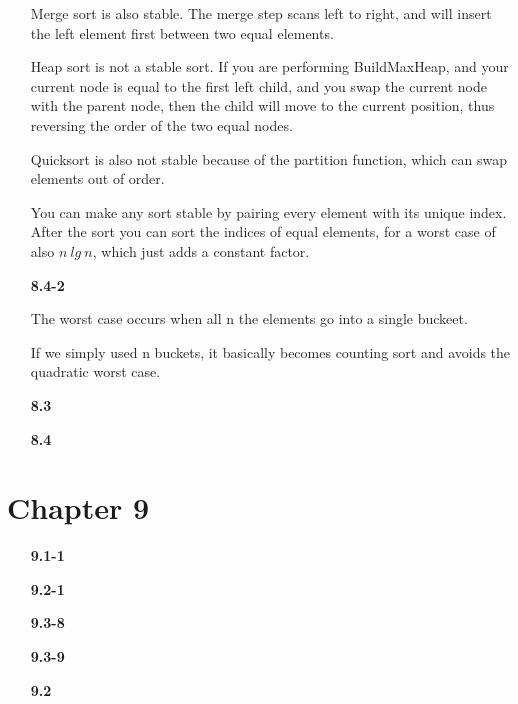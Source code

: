 \documentclass{article}
\begin{document}
\begin{enumerate}
	Merge sort is also stable. The merge step scans left to right, and will insert the left element first between two equal elements. 

	Heap sort is not a stable sort. If you are performing BuildMaxHeap, and your
	current node is equal to the first left child, and you swap the current node
	with the parent node, then the child will move to the current position, thus
	reversing the order of the two equal nodes.

	Quicksort is also not stable because of the partition function, which can swap elements out of order.

	You can make any sort stable by pairing every element with its unique index.
	After the sort you can sort the indices of equal elements, for a worst case
	of also $n\ lg\ n$, which just adds a constant factor.

\item[\textbf{8.4-2}]

	The worst case occurs when all n the elements go into a single buckeet.

	If we simply used n buckets, it basically becomes counting sort and avoids the quadratic worst case.

\item[\textbf{8.3}]

\item[\textbf{8.4}]

\end{enumerate}

\section*{Chapter 9}

\begin{enumerate}

\item[\textbf{9.1-1}]

\item[\textbf{9.2-1}]

\item[\textbf{9.3-8}]

\item[\textbf{9.3-9}]

\item[\textbf{9.2}]

\end{enumerate}
\end{document}
